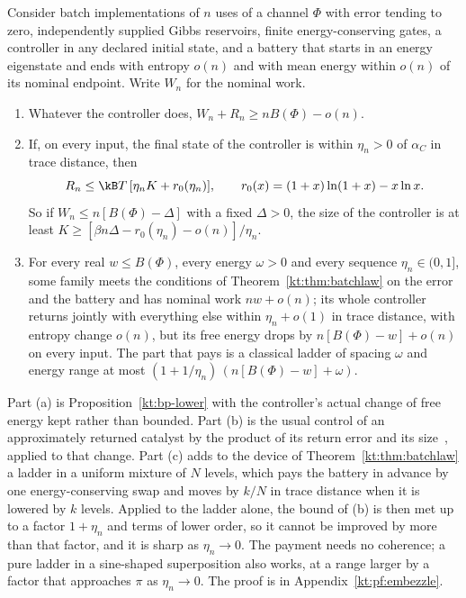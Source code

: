 \begin{corollary}\label{kt:cor:embezzle}
Consider batch implementations of $n$ uses of a channel $\Phi$ with error tending to zero, independently supplied Gibbs reservoirs, finite energy-conserving gates, a controller in any declared initial state, and a battery that starts in an energy eigenstate and ends with entropy $o(n)$ and with mean energy within $o(n)$ of its nominal endpoint. Write $W_n$ for the nominal work.
\begin{enumerate}[label=(\alph*)]
\item Whatever the controller does, $W_n+R_n\ge nB(\Phi)-o(n)$.
\item If, on every input, the final state of the controller is within $\eta_n>0$ of $\alpha_C$ in trace distance, then
\[
R_n\le\kB T\,[\eta_nK+r_0(\eta_n)],\qquad r_0(x)=(1+x)\ln(1+x)-x\ln x.
\]
So if $W_n\le n[B(\Phi)-\Delta]$ with a fixed $\Delta>0$, the size of the controller is at least $K\ge[\beta n\Delta-r_0(\eta_n)-o(n)]/\eta_n$.
\item For every real $w\le B(\Phi)$, every energy $\omega>0$ and every sequence $\eta_n\in(0,1]$, some family meets the conditions of Theorem~\ref{kt:thm:batchlaw} on the error and the battery and has nominal work $nw+o(n)$; its whole controller returns jointly with everything else within $\eta_n+o(1)$ in trace distance, with entropy change $o(n)$, but its free energy drops by $n[B(\Phi)-w]+o(n)$ on every input. The part that pays is a classical ladder of spacing $\omega$ and energy range at most $(1+1/\eta_n)\,(n[B(\Phi)-w]+\omega)$.
\end{enumerate}
\end{corollary}

Part (a) is Proposition~\ref{kt:bp-lower} with the controller's actual change of free energy kept rather than bounded. Part (b) is the usual control of an approximately returned catalyst by the product of its return error and its size~\cite{BrandaoSecondLaws15,NgCatalysis15}, applied to that change. Part (c) adds to the device of Theorem~\ref{kt:thm:batchlaw} a ladder in a uniform mixture of $N$ levels, which pays the battery in advance by one energy-conserving swap and moves by $k/N$ in trace distance when it is lowered by $k$ levels. Applied to the ladder alone, the bound of (b) is then met up to a factor $1+\eta_n$ and terms of lower order, so it cannot be improved by more than that factor, and it is sharp as $\eta_n\to0$. The payment needs no coherence; a pure ladder in a sine-shaped superposition also works, at a range larger by a factor that approaches $\pi$ as $\eta_n\to0$. The proof is in Appendix~\ref{kt:pf:embezzle}.

